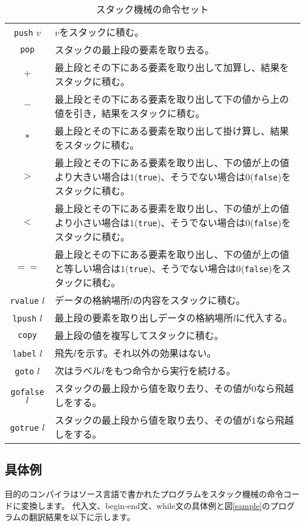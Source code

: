 \documentclass[a4paper,11pt]{jsarticle}
\begin{document}
\begin{table}[H]
\caption{スタック機械の命令セット} \label{stackcommand}
\centering
\normalsize{
  \begin{tabular}{c|p{}}
    \hline
    \texttt{push} $v$ & $v$をスタックに積む。\\
    \texttt{pop} & スタックの最上段の要素を取り去る。\\
    $+$ & 最上段とその下にある要素を取り出して加算し、結果をスタックに積む。\\
    $-$ & 最上段とその下にある要素を取り出して下の値から上の値を引き，結果をスタックに積む。\\
    $\ast$ & 最上段とその下にある要素を取り出して掛け算し、結果をスタックに積む。\\
    $>$ & 最上段とその下にある要素を取り出し、下の値が上の値より大きい場合は$1$(\texttt{true})、そうでない場合は$0$(\texttt{false})をスタックに積む。\\
    $<$ & 最上段とその下にある要素を取り出し、下の値が上の値より小さい場合は$1$(\texttt{true})、そうでない場合は$0$(\texttt{false})をスタックに積む。\\
    $==$ & 最上段とその下にある要素を取り出し、下の値が上の値と等しい場合は$1$(\texttt{true})、そうでない場合は$0$(\texttt{false})をスタックに積む。\\
    \texttt{rvalue} $l$ & データの格納場所$l$の内容をスタックに積む。\\
    \texttt{lpush} $l$ & 最上段の要素を取り出しデータの格納場所$l$に代入する。\\
    \texttt{copy} & 最上段の値を複写してスタックに積む。\\
    \texttt{label} $l$ & 飛先$l$を示す。それ以外の効果はない。\\
    \texttt{goto} $l$ & 次はラベル$l$をもつ命令から実行を続ける。\\
    \texttt{gofalse} $l$ & スタックの最上段から値を取り去り、その値が$0$なら飛越しをする。\\
    \texttt{gotrue} $l$ & スタックの最上段から値を取り去り、その値が$1$なら飛越しをする。\\
    \hline
  \end{tabular}
}
\end{table}

\subsection{具体例}
目的のコンパイラはソース言語で書かれたプログラムをスタック機械の命令コードに変換します。
代入文、begin-end文、while文の具体例と図\ref{sample}のプログラムの翻訳結果を以下に示します。
\end{document}
